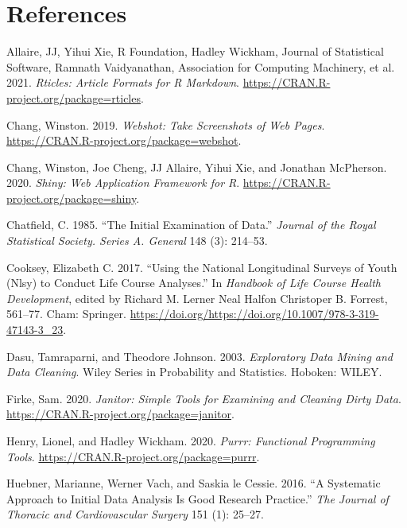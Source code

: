 \documentclass{article}
\begin{document}
\hypertarget{references}{%
\section*{References}\label{references}}

\hypertarget{refs}{}
\leavevmode\hypertarget{ref-rticles}{}%
Allaire, JJ, Yihui Xie, R Foundation, Hadley Wickham, Journal of Statistical Software, Ramnath Vaidyanathan, Association for Computing Machinery, et al. 2021. \emph{Rticles: Article Formats for R Markdown}. \url{https://CRAN.R-project.org/package=rticles}.

\leavevmode\hypertarget{ref-webshot}{}%
Chang, Winston. 2019. \emph{Webshot: Take Screenshots of Web Pages}. \url{https://CRAN.R-project.org/package=webshot}.

\leavevmode\hypertarget{ref-shiny}{}%
Chang, Winston, Joe Cheng, JJ Allaire, Yihui Xie, and Jonathan McPherson. 2020. \emph{Shiny: Web Application Framework for R}. \url{https://CRAN.R-project.org/package=shiny}.

\leavevmode\hypertarget{ref-Chatfield1985TIEo}{}%
Chatfield, C. 1985. ``The Initial Examination of Data.'' \emph{Journal of the Royal Statistical Society. Series A. General} 148 (3): 214--53.

\leavevmode\hypertarget{ref-eliznlsy}{}%
Cooksey, Elizabeth C. 2017. ``Using the National Longitudinal Surveys of Youth (Nlsy) to Conduct Life Course Analyses.'' In \emph{Handbook of Life Course Health Development}, edited by Richard M. Lerner Neal Halfon Christoper B. Forrest, 561--77. Cham: Springer. \url{https://doi.org/https://doi.org/10.1007/978-3-319-47143-3_23}.

\leavevmode\hypertarget{ref-DasuTamraparni2003Edma}{}%
Dasu, Tamraparni, and Theodore Johnson. 2003. \emph{Exploratory Data Mining and Data Cleaning}. Wiley Series in Probability and Statistics. Hoboken: WILEY.

\leavevmode\hypertarget{ref-janitor}{}%
Firke, Sam. 2020. \emph{Janitor: Simple Tools for Examining and Cleaning Dirty Data}. \url{https://CRAN.R-project.org/package=janitor}.

\leavevmode\hypertarget{ref-purrr}{}%
Henry, Lionel, and Hadley Wickham. 2020. \emph{Purrr: Functional Programming Tools}. \url{https://CRAN.R-project.org/package=purrr}.

\leavevmode\hypertarget{ref-HuebnerMariannePhD2016Asat}{}%
Huebner, Marianne, Werner Vach, and Saskia le Cessie. 2016. ``A Systematic Approach to Initial Data Analysis Is Good Research Practice.'' \emph{The Journal of Thoracic and Cardiovascular Surgery} 151 (1): 25--27.
\end{document}
